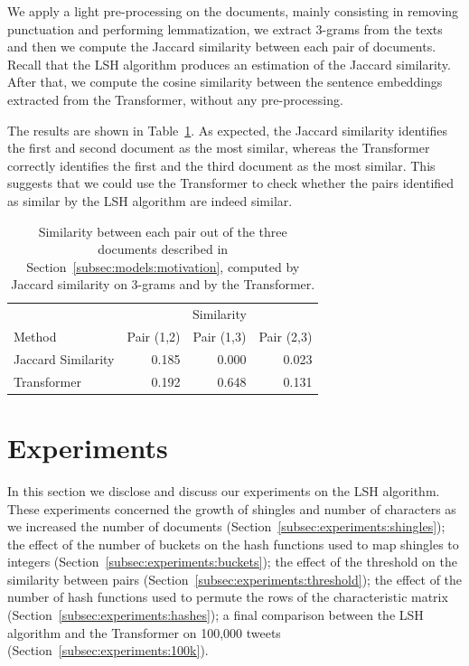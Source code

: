 \documentclass[runningheads]{llncs}
\begin{document}
We apply a light pre-processing on the documents, mainly consisting in removing punctuation and performing lemmatization, we extract 3-grams from the texts and then we compute the Jaccard similarity between each pair of documents. Recall that the LSH algorithm produces an estimation of the Jaccard similarity. After that, we compute the cosine similarity between the sentence embeddings extracted from the Transformer, without any pre-processing.

The results are shown in Table~\ref{tab:models:comparison}. As expected, the Jaccard similarity identifies the first and second document as the most similar, whereas the Transformer correctly identifies the first and the third document as the most similar. This suggests that we could use the Transformer to check whether the pairs identified as similar by the LSH algorithm are indeed similar.

\begin{table}
  \caption{Similarity between each pair out of the three documents described in Section~\ref{subsec:models:motivation}, computed by Jaccard similarity on 3-grams and by the Transformer.}
  \label{tab:models:comparison}
  \centering
  \begin{tabular}{lrrr}
      \toprule
      & \multicolumn{3}{c}{Similarity} \\
      Method & Pair (1,2) & Pair (1,3) & Pair (2,3) \\
      \midrule
      Jaccard Similarity & 0.185 & 0.000 & 0.023\\
      Transformer & 0.192 & 0.648 & 0.131 \\
      \bottomrule
  \end{tabular}
\end{table}

\section{Experiments}
\label{sec:experiments}

In this section we disclose and discuss our experiments on the LSH algorithm. These experiments concerned the growth of shingles and number of characters as we increased the number of documents (Section~\ref{subsec:experiments:shingles}); the effect of the number of buckets on the hash functions used to map shingles to integers (Section~\ref{subsec:experiments:buckets}); the effect of the threshold on the similarity between pairs (Section~\ref{subsec:experiments:threshold}); the effect of the number of hash functions used to permute the rows of the characteristic matrix (Section~\ref{subsec:experiments:hashes}); a final comparison between the LSH algorithm and the Transformer on 100,000 tweets (Section~\ref{subsec:experiments:100k}).
\end{document}
